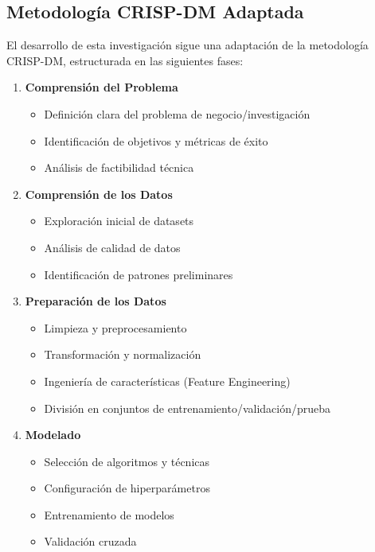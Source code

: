\subsection{Metodología CRISP-DM Adaptada}

El desarrollo de esta investigación sigue una adaptación de la metodología CRISP-DM, estructurada en las siguientes fases:

\begin{enumerate}
    \item \textbf{Comprensión del Problema}
        \begin{itemize}
            \item Definición clara del problema de negocio/investigación
            \item Identificación de objetivos y métricas de éxito
            \item Análisis de factibilidad técnica
        \end{itemize}
    
    \item \textbf{Comprensión de los Datos}
        \begin{itemize}
            \item Exploración inicial de datasets
            \item Análisis de calidad de datos
            \item Identificación de patrones preliminares
        \end{itemize}
    
    \item \textbf{Preparación de los Datos}
        \begin{itemize}
            \item Limpieza y preprocesamiento
            \item Transformación y normalización
            \item Ingeniería de características (Feature Engineering)
            \item División en conjuntos de entrenamiento/validación/prueba
        \end{itemize}
    
    \item \textbf{Modelado}
        \begin{itemize}
            \item Selección de algoritmos y técnicas
            \item Configuración de hiperparámetros
            \item Entrenamiento de modelos
            \item Validación cruzada
        \end{itemize}
    

\end{enumerate}
